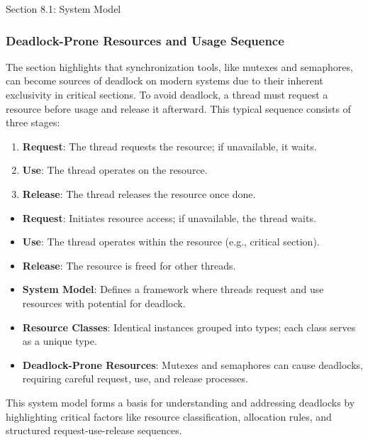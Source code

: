 \begin{notes}{Section 8.1: System Model}
    \subsubsection*{Deadlock-Prone Resources and Usage Sequence}
    
    The section highlights that synchronization tools, like mutexes and semaphores, can become sources of deadlock on modern systems due to their inherent exclusivity in critical sections. To 
    avoid deadlock, a thread must request a resource before usage and release it afterward. This typical sequence consists of three stages:

    \begin{enumerate}
        \item \textbf{Request}: The thread requests the resource; if unavailable, it waits.
        \item \textbf{Use}: The thread operates on the resource.
        \item \textbf{Release}: The thread releases the resource once done.
    \end{enumerate}
    
    \begin{highlight}
    
        \begin{itemize}
            \item \textbf{Request}: Initiates resource access; if unavailable, the thread waits.
            \item \textbf{Use}: The thread operates within the resource (e.g., critical section).
            \item \textbf{Release}: The resource is freed for other threads.
        \end{itemize}
    
    \end{highlight}
    
    \begin{highlight}
    
        \begin{itemize}
            \item \textbf{System Model}: Defines a framework where threads request and use resources with potential for deadlock.
            \item \textbf{Resource Classes}: Identical instances grouped into types; each class serves as a unique type.
            \item \textbf{Deadlock-Prone Resources}: Mutexes and semaphores can cause deadlocks, requiring careful request, use, and release processes.
        \end{itemize}
    
    This system model forms a basis for understanding and addressing deadlocks by highlighting critical factors like resource classification, allocation rules, and structured request-use-release sequences.
    
    \end{highlight}
\end{notes}

